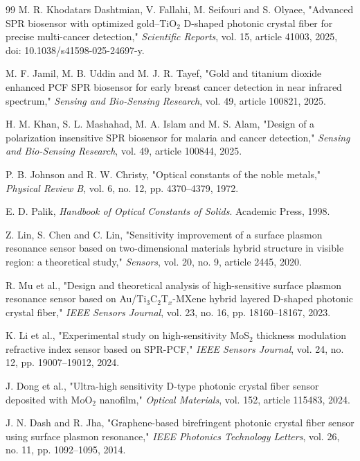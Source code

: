\documentclass[5p,times,twocolumn]{elsarticle}
\begin{document}
\begin{thebibliography}{99}
 M. R. Khodatars Dashtmian, V. Fallahi, M. Seifouri and S. Olyaee, "Advanced SPR biosensor with optimized gold--TiO$_2$ D-shaped photonic crystal fiber for precise multi-cancer detection," \textit{Scientific Reports}, vol. 15, article 41003, 2025, doi: 10.1038/s41598-025-24697-y.

 M. F. Jamil, M. B. Uddin and M. J. R. Tayef, "Gold and titanium dioxide enhanced PCF SPR biosensor for early breast cancer detection in near infrared spectrum," \textit{Sensing and Bio-Sensing Research}, vol. 49, article 100821, 2025.

 H. M. Khan, S. L. Mashahad, M. A. Islam and M. S. Alam, "Design of a polarization insensitive SPR biosensor for malaria and cancer detection," \textit{Sensing and Bio-Sensing Research}, vol. 49, article 100844, 2025.

 P. B. Johnson and R. W. Christy, "Optical constants of the noble metals," \textit{Physical Review B}, vol. 6, no. 12, pp. 4370--4379, 1972.

 E. D. Palik, \textit{Handbook of Optical Constants of Solids}. Academic Press, 1998.

 Z. Lin, S. Chen and C. Lin, "Sensitivity improvement of a surface plasmon resonance sensor based on two-dimensional materials hybrid structure in visible region: a theoretical study," \textit{Sensors}, vol. 20, no. 9, article 2445, 2020.

 R. Mu et al., "Design and theoretical analysis of high-sensitive surface plasmon resonance sensor based on Au/Ti$_3$C$_2$T$_x$-MXene hybrid layered D-shaped photonic crystal fiber," \textit{IEEE Sensors Journal}, vol. 23, no. 16, pp. 18160--18167, 2023.

 K. Li et al., "Experimental study on high-sensitivity MoS$_2$ thickness modulation refractive index sensor based on SPR-PCF," \textit{IEEE Sensors Journal}, vol. 24, no. 12, pp. 19007--19012, 2024.

 J. Dong et al., "Ultra-high sensitivity D-type photonic crystal fiber sensor deposited with MoO$_2$ nanofilm," \textit{Optical Materials}, vol. 152, article 115483, 2024.

 J. N. Dash and R. Jha, "Graphene-based birefringent photonic crystal fiber sensor using surface plasmon resonance," \textit{IEEE Photonics Technology Letters}, vol. 26, no. 11, pp. 1092--1095, 2014.


\end{thebibliography}
\end{document}
